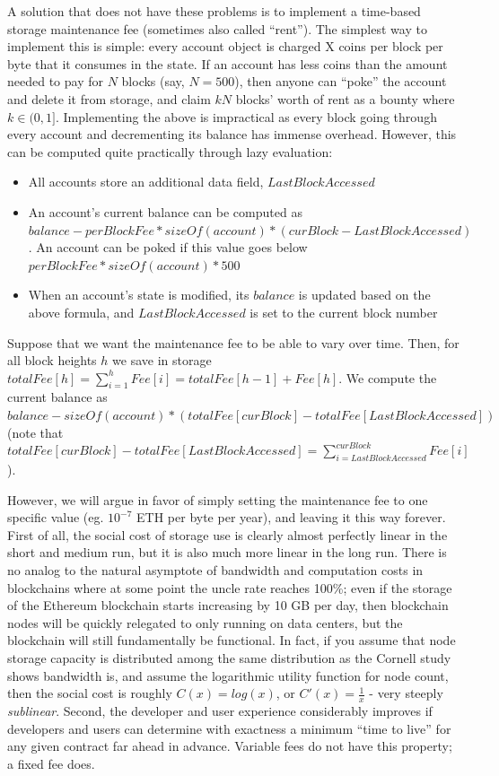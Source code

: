 \documentclass[12pt, final]{article}
\begin{document}
A solution that does not have these problems is to implement a time-based storage maintenance fee (sometimes also called ``rent''). The simplest way to implement this is simple: every account object is charged X coins per block per byte that it consumes in the state. If an account has less coins than the amount needed to pay for $N$ blocks (say, $N = 500$), then anyone can ``poke'' the account and delete it from storage, and claim $k N$ blocks' worth of rent as a bounty where $k \in (0,1]$. Implementing the above is impractical as every block going through every account and decrementing its balance has immense overhead. However, this can be computed quite practically through lazy evaluation:

\begin{itemize}
\item All accounts store an additional data field, $LastBlockAccessed$
\item An account's current balance can be computed as $balance - perBlockFee * sizeOf(account) * (curBlock - LastBlockAccessed)$. An account can be poked if this value goes below $perBlockFee * sizeOf(account) * 500$
\item When an account's state is modified, its $balance$ is updated based on the above formula, and $LastBlockAccessed$ is set to the current block number
\end{itemize}

Suppose that we want the maintenance fee to be able to vary over time. Then, for all block heights $h$ we save in storage $totalFee[h] = \sum_{i=1}^h Fee[i] = totalFee[h-1] + Fee[h]$. We compute the current balance as $balance - sizeOf(account) * (totalFee[curBlock] - totalFee[LastBlockAccessed])$ (note that $totalFee[curBlock] - totalFee[LastBlockAccessed] = \sum_{i=LastBlockAccessed}^{curBlock} Fee[i]$).

However, we will argue in favor of simply setting the maintenance fee to one specific value (eg. $10^{-7}$ ETH per byte per year), and leaving it this way forever. First of all, the social cost of storage use is clearly almost perfectly linear in the short and medium run, but it is also much more linear in the long run. There is no analog to the natural asymptote of bandwidth and computation costs in blockchains where at some point the uncle rate reaches 100\%; even if the storage of the Ethereum blockchain starts increasing by 10 GB per day, then blockchain nodes will be quickly relegated to only running on data centers, but the blockchain will still fundamentally be functional. In fact, if you assume that node storage capacity is distributed among the same distribution as the Cornell study\cite{cornell} shows bandwidth is, and assume the logarithmic utility function for node count, then the social cost is roughly $C(x) = log(x)$, or $C'(x) = \frac{1}{x}$ - very steeply \emph{sublinear}. Second, the developer and user experience considerably improves if developers and users can determine with exactness a minimum ``time to live'' for any given contract far ahead in advance. Variable fees do not have this property; a fixed fee does.
\end{document}
